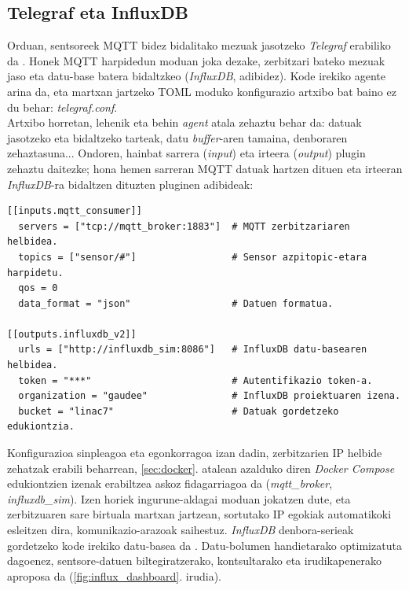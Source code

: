 \documentclass[12pt]{article}
\numberwithin{figure}{section}
\numberwithin{equation}{section}
\begin{document}
\subsection{Telegraf eta InfluxDB}
Orduan, sentsoreek MQTT bidez bidalitako mezuak jasotzeko \textit{Telegraf} erabiliko da \cite{noauthor_telegraf_2022}. Honek MQTT harpidedun moduan joka dezake, zerbitzari bateko mezuak jaso eta datu-base batera bidaltzkeo (\textit{InfluxDB}, adibidez). Kode irekiko agente arina da, eta martxan jartzeko TOML moduko konfigurazio artxibo bat baino ez du behar: \textit{telegraf.conf}.\\

Artxibo horretan, lehenik eta behin \textit{agent} atala zehaztu behar da: datuak jasotzeko eta bidaltzeko tarteak, datu \textit{buffer}-aren tamaina, denboraren zehaztasuna... Ondoren, hainbat sarrera (\textit{input}) eta irteera (\textit{output}) plugin zehaztu daitezke; hona hemen sarreran MQTT datuak hartzen dituen eta irteeran \textit{InfluxDB}-ra bidaltzen dituzten pluginen adibideak:\\

\begin{verbatim}
[[inputs.mqtt_consumer]]
  servers = ["tcp://mqtt_broker:1883"]  # MQTT zerbitzariaren helbidea.
  topics = ["sensor/#"]                 # Sensor azpitopic-etara harpidetu.
  qos = 0
  data_format = "json"                  # Datuen formatua.

[[outputs.influxdb_v2]]
  urls = ["http://influxdb_sim:8086"]   # InfluxDB datu-basearen helbidea.
  token = "***"                         # Autentifikazio token-a.
  organization = "gaudee"               # InfluxDB proiektuaren izena.
  bucket = "linac7"                     # Datuak gordetzeko edukiontzia.
\end{verbatim}

Konfigurazioa sinpleagoa eta egonkorragoa izan dadin, zerbitzarien IP helbide zehatzak erabili beharrean, \ref{sec:docker}. atalean azalduko diren \textit{Docker Compose} edukiontzien izenak erabiltzea askoz fidagarriagoa da (\textit{mqtt\_broker}, \textit{influxdb\_sim}). Izen horiek ingurune\hyp{}aldagai moduan jokatzen dute, eta zerbitzuaren sare birtuala martxan jartzean, sortutako IP egokiak automatikoki esleitzen dira, komunikazio\hyp{}arazoak saihestuz.
\newpage
\textit{InfluxDB} denbora-serieak gordetzeko kode irekiko datu-basea da \cite{noauthor_influxdb_2022}. Datu-bolumen handietarako optimizatuta dagoenez, sentsore-datuen biltegiratzerako, kontsultarako eta irudikapenerako aproposa da (\ref{fig:influx_dashboard}. irudia).\\
\end{document}

